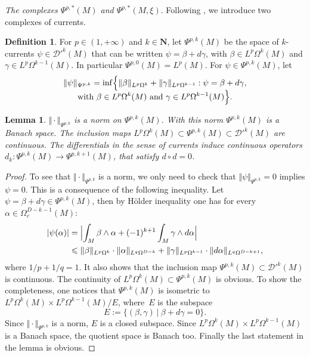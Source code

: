 \documentclass[JEP,XML,SOM,Unicode,published]{cedram}
\newcommand{\NN}{\mathbf{N}}
\theoremstyle{plain}
\newtheorem{lemma}[equation]{Lemma}
\theoremstyle{remark}
\theoremstyle{definition}
\newtheorem{definition}[equation]{Definition}
\begin{document}
\textit{The complexes $\Psi^{p, *}(M)$ and $\Psi^{p , *}(M, \xi)$}. Following \cite{Pa09},
we introduce two complexes of currents.
\begin{definition}
For $p \in (1, +\infty)$ and $k \in \NN$, let $\Psi^{p,k} (M)$ be the space of $k$-currents
$\psi \in \mathcal D '^k(M)$ that can be written
$\psi = \beta + d\gamma$, with $\beta \in L^p \Omega^k (M)$ and $\gamma \in L^p \Omega^{k-1} (M)$.
In particular $\Psi^{p,0} (M) = L^p(M)$.
For $\psi \in \Psi^{p,k} (M)$, let
\begin{multline*}
\Vert \psi \Vert_{\Psi^{p,k}} = \inf \Bigl\{\Vert \beta \Vert_{L^p \Omega^k} + \Vert \gamma \Vert_{L^p \Omega^{k-1}}:
\psi = \beta + d\gamma, \\[-5pt]
\text{with } \beta \in L^p \Omega^k (M)\text{ and } \gamma \in L^p \Omega^{k-1} (M)\Bigr\}.
\end{multline*}
\end{definition}

\begin{lemma}\label{current-lemma1}
$\Vert {\cdot} \Vert_{\Psi^{p,k}}$ is a norm on $\Psi^{p,k} (M)$. With this norm
$\Psi^{p,k} (M)$ is a Banach space. The inclusion maps $L^p\Omega^k (M) \subset \Psi^{p,k} (M) \subset \mathcal D '^k(M)$ are continuous.
The differentials in the sense of currents induce continuous operators
$d_k: \Psi^{p,k} (M) \to \Psi^{p,k+1} (M)$,
that satisfy $d \circ d =0$.
\end{lemma}

\begin{proof}
To see that $\Vert {\cdot} \Vert_{\Psi^{p,k}}$ is a norm, we only need to check that $\Vert \psi \Vert_{\Psi^{p,k}}=0$ implies $\psi =0$.
This is a consequence of the following inequality. Let $\psi = \beta + d\gamma \in \Psi^{p,k} (M)$, then by Hölder
inequality one has
for every $\alpha \in \Omega_c^{D -k-1} (M)$:
\begin{align*}
\vert \psi (\alpha) \vert &= \Bigl\vert \int_M \beta \wedge \alpha + (-1)^{k+1}\int_M \gamma \wedge d\alpha \Bigr\vert\\
&\leqslant
\Vert \beta \Vert_{L^p \Omega^k} \cdot \Vert \alpha \Vert_{L^q \Omega^{D- k}}
+
\Vert \gamma \Vert_{L^p \Omega^{k-1}} \cdot \Vert d\alpha \Vert_{L^q \Omega^{D- k +1}},
\end{align*}
where $1/p + 1/q =1$. It also shows that the inclusion map
$\Psi^{p,k} (M) \subset \mathcal D '^k(M)$ is continuous. The continuity of $L^p\Omega^k (M) \subset \Psi^{p,k} (M)$
is obvious.
To show the completeness, one notices that $\Psi^{p,k}(M)$ is isometric to $L^p \Omega^k(M) \times L^p \Omega^{k-1}(M) / E$, where~$E$ is the subspace
\[E:= \{(\beta, \gamma) ~\vert ~ \beta + d \gamma =0\}.\]
Since $\Vert {\cdot} \Vert_{\Psi^{p,k}}$ is a norm,
$E$ is a closed subspace. Since $L^p \Omega^k(M) \times L^p \Omega^{k-1}(M)$ is a Banach space, the quotient space is Banach too.
Finally the last statement in the lemma is obvious.
\end{proof}
\end{document}
